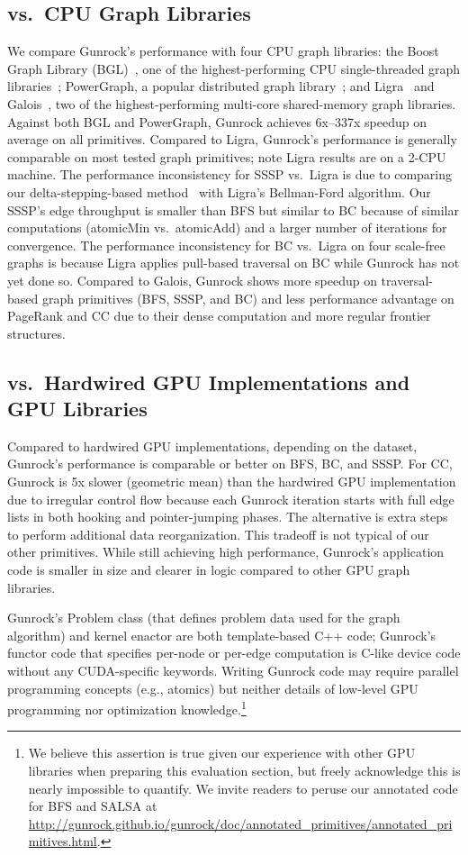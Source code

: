 \documentclass[format=acmsmall,review=false,screen=true]{acmart}
\begin{document}
\subsection{vs.\ CPU Graph Libraries} We compare Gunrock's performance
with four CPU graph libraries: the Boost Graph Library
(BGL)~\cite{Siek:2001:TBG}, one of the highest-performing CPU
single-threaded graph libraries~\cite{McColl:2014:APE}; PowerGraph, a
popular distributed graph library~\cite{Gonzalez:2012:PDG}; and
Ligra~\cite{Shun:2013:LAL} and
Galois~\cite{Nguyen:2013:ALI,Pingali:2011:TTO}, two of the
highest-performing multi-core shared-memory graph libraries. Against
both BGL and PowerGraph, Gunrock achieves 6x--337x speedup on average
on all primitives. Compared to Ligra, Gunrock's performance is
generally comparable on most tested graph primitives; note Ligra
results are on a 2-CPU machine. The performance inconsistency for SSSP
vs.\ Ligra is due to comparing our delta-stepping-based
method~\cite{Meyer:2003:DAP} with Ligra's Bellman-Ford algorithm. Our
SSSP's edge throughput is smaller than BFS but similar to BC because
of similar computations (atomicMin vs.\ atomicAdd) and a larger number
of iterations for convergence. The performance inconsistency for BC
vs.\ Ligra on four scale-free graphs is because Ligra applies
pull-based traversal on BC while Gunrock has not yet done so. Compared
to Galois, Gunrock shows more speedup on traversal-based graph
primitives (BFS, SSSP, and BC) and less performance advantage on
PageRank and CC due to their dense computation and more regular
frontier structures.

\subsection{vs.\ Hardwired GPU Implementations and GPU Libraries}
Compared to hardwired GPU implementations, depending on the dataset,
Gunrock's performance is comparable or better on BFS, BC, and SSSP\@.
For CC, Gunrock is 5x slower (geometric mean) than the hardwired GPU
implementation due to irregular control flow because each Gunrock
iteration starts with full edge lists in both hooking and
pointer-jumping phases. The alternative is extra steps to perform
additional data reorganization. This tradeoff is not typical of our
other primitives. While still achieving high performance, Gunrock's
application code is smaller in size and clearer in logic compared to
other GPU graph libraries.

Gunrock's Problem class (that defines problem data used for the graph
algorithm) and kernel enactor are both template-based C++ code;
Gunrock's functor code that specifies per-node or per-edge computation
is C-like device code without any CUDA-specific keywords. Writing
Gunrock code may require parallel programming concepts (e.g., atomics)
but neither details of low-level GPU programming nor optimization
knowledge.\footnote{We believe this assertion is true given our
  experience with other GPU libraries when preparing this evaluation
  section, but freely acknowledge this is nearly impossible to
  quantify. We invite readers to peruse our annotated code for BFS and
  SALSA at \url{http://gunrock.github.io/gunrock/doc/annotated_primitives/annotated_primitives.html}.}
\end{document}

